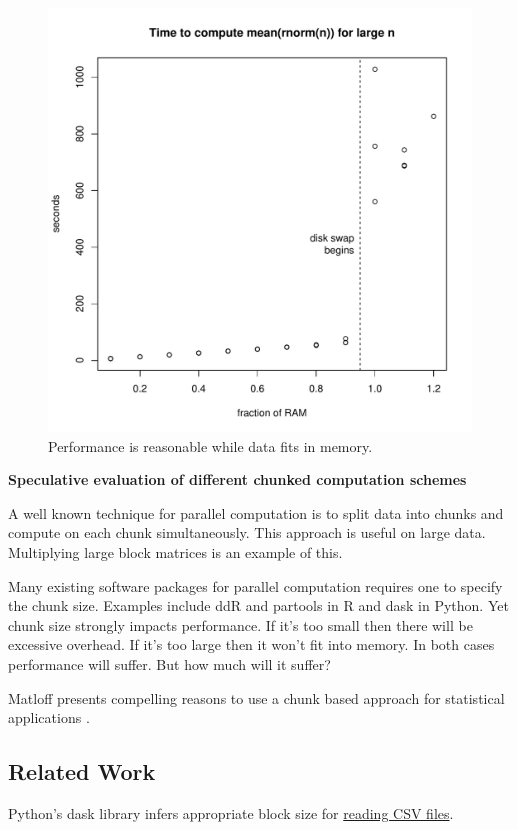 \documentclass[12pt]{article}
\begin{document}
\begin{figure}
\centering
\includegraphics[width=.8\linewidth]{swap/spinning_disk_swap}
\caption{Performance is reasonable while data fits in memory.}
\label{fig:test}
\end{figure}



\textbf{Speculative evaluation of different chunked computation schemes}

A well known technique for parallel computation is to split data into
chunks and compute on each chunk simultaneously. This approach 
is useful on large data. Multiplying large block matrices is an example of this.

Many existing software packages for parallel computation requires one to specify the
chunk size. Examples include ddR \cite{R-ddR} and partools
\cite{R-partools} in R and dask in Python.
Yet chunk size strongly impacts
performance. If it's too small then there will be excessive overhead. If
it's too large then it won't fit into memory. In both cases performance
will suffer. But how much will it suffer?

Matloff presents compelling reasons to use a chunk based
approach for statistical applications \cite{matloff2014software}.

\subsection{Related Work}

Python's dask library infers appropriate block size for
\href{https://github.com/dask/dask/pull/1328}{reading CSV files}.
\end{document}
